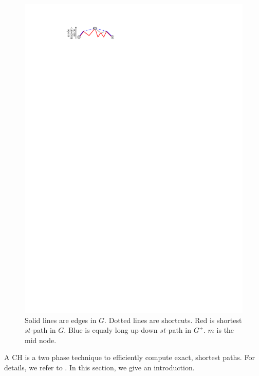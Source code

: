 \documentclass[a4paper,UKenglish,cleveref, autoref, thm-restate]{lipics-v2021}
\begin{document}
\begin{figure}
\centering
\includegraphics{fig/ch}
\caption{
Solid lines are edges in $G$. Dotted lines are shortcuts. Red is shortest $st$-path in $G$. Blue is equaly long up-down $st$-path in $G^+$. $m$ is the mid node.
}
\label{fig:ch}
\end{figure}

A CH is a two phase technique to efficiently compute exact, shortest paths.
For details, we refer to \cite{gssv-erlrn-12,dsw-cch-15}.
In this section, we give an introduction.
\end{document}
